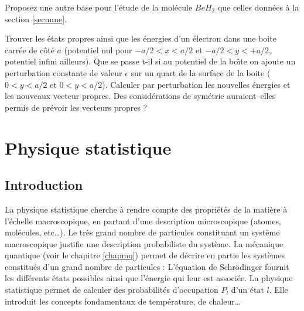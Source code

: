 \documentclass[12pt]{book}
\begin{document}
\begin{exo}
Proposez une autre base pour l'\'etude de la mol\'ecule $BeH_{2}$ que celles
donn\'ees \`a la section \ref{secnnne}.
\end{exo}
\begin{exo}
Trouver les \'etats propres ainsi que les \'energies d'un \'electron dans une
boite carr\'ee de c\^ot\'e $a$ (potentiel nul pour $-a/2<x<a/2$ et
$-a/2<y<+a/2$, potentiel infini ailleurs). 
Que se passe t-il si au potentiel de la bo\^\i te on ajoute un perturbation
constante de valeur $\epsilon$ sur un quart de la surface de la boite
($0<y<a/2$ et $0<y<a/2$).
Calculer par perturbation les nouvelles \'energies et les nouveaux vecteur
propres. Des consid\'erations de sym\'etrie auraient--elles permis de pr\'evoir
les vecteurs propres ?
\end{exo}



\chapter{Physique  statistique}\label{chapphysstat}
\section{Introduction}
La physique statistique cherche \`a rendre compte des propri\'et\'es
de la mati\`ere \`a l'\'echelle macroscopique, en partant d'une
description microscopique (atomes, mol\'ecules, etc\dots). Le tr\`es
grand nombre de particules constituant un syst\`eme macroscopique
justifie une description probabiliste du syst\`eme. La m\'ecanique
quantique (voir le chapitre \ref{chapmq}) permet de d\'ecrire en
partie les syst\`emes constitu\'es 
d'un grand nombre de particules : L'\'equation de
Schr\"odinger fournit les diff\'erents \'etats possibles ainsi que
l'\'energie qui leur est associ\'ee. La physique statistique permet de
calculer des probabilit\'es d'occupation $P_l$ d'un 
\'etat $l$. Elle introduit les concepts
fondamentaux de temp\'erature, de chaleur\dots
\end{document}
